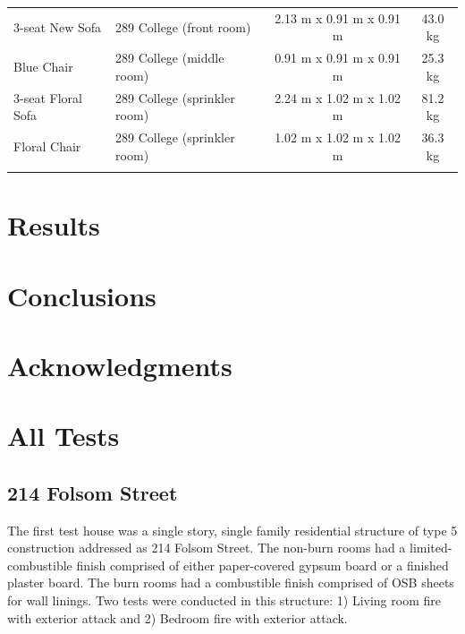 \documentclass[12pt,oneside]{book}
\begin{document}
\begin{table}
\begin{tabular}{llcc}
3-seat New Sofa              &  289 College (front room)         &  2.13 m x 0.91 m x 0.91 m  &  43.0 kg    \\
Blue Chair                   &  289 College (middle room)        &  0.91 m x 0.91 m x 0.91 m  &  25.3 kg    \\
3-seat Floral Sofa           &  289 College (sprinkler room)     &  2.24 m x 1.02 m x 1.02 m  &  81.2 kg    \\
Floral Chair                 &  289 College (sprinkler room)     &  1.02 m x 1.02 m x 1.02 m  &  36.3 kg    \\
\noalign{\smallskip}\hline
\end{tabular}
\label{tab:Fuel_Masses}
\end{table}

\chapter{Results}
\label{chap:Results}


\clearpage


\chapter{Conclusions}
\label{chap:Conclusions}

\chapter{Acknowledgments}
\label{chap:Acknowledgments}



\appendix

\chapter{All Tests}

\section{214 Folsom Street}

The first test house was a single story, single family residential structure of type 5 construction addressed as 214 Folsom Street. The non-burn rooms had a limited-combustible finish comprised of either paper-covered gypsum board or a finished plaster board. The burn rooms had a combustible finish comprised of OSB sheets for wall linings. Two tests were conducted in this structure: 1) Living room fire with exterior attack and 2) Bedroom fire with exterior attack.
\end{document}
